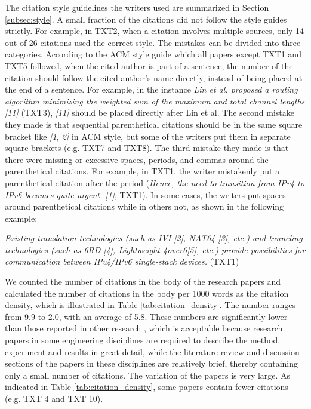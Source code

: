 The citation style guidelines the writers used are summarized in Section \ref{subsec:style}. A small fraction of the citations did not follow the style guides strictly. For example, in TXT2, when a citation involves multiple sources, only 14 out of 26 citations used the correct style. The mistakes can be divided into three categories. According to the ACM style guide which all papers except TXT1 and TXT5 followed, when the cited author is part of a sentence, the number of the citation should follow the cited author’s name directly, instead of being placed at the end of a sentence. For example, in the instance \textit{Lin et al. proposed a routing algorithm minimizing the weighted sum of the maximum and total channel lengths [11]} (TXT3), \textit{[11]} should be placed directly after Lin et al. The second mistake they made is that sequential parenthetical citations should be in the same square bracket like \textit{[1, 2]} in ACM style, but some of the writers put them in separate square brackets (e.g. TXT7 and TXT8). The third mistake they made is that there were missing or excessive spaces, periods, and commas around the parenthetical citations. For example, in TXT1, the writer mistakenly put a parenthetical citation after the period (\textit{Hence, the need to transition from IPv4 to IPv6 becomes quite urgent. [1]}, TXT1). In some cases, the writers put spaces around parenthetical citations while in others not, as shown in the following example:

\textit{Existing translation technologies (such as IVI [2], NAT64 [3], etc.) and tunneling technologies (such as 6RD [4], Lightweight 4over6[5], etc.) provide possibilities for communication between IPv4/IPv6 single-stack devices.} (TXT1)

We counted the number of citations in the body of the research papers and calculated the number of citations in the body per 1000 words as the citation density, which is illustrated in Table \ref{tab:citation_density}. The number ranges from 9.9 to 2.0, with an average of 5.8. These numbers are significantly lower than those reported in other research \citep{fazel_citation_2015,samraj_form_2013,wette_source_2017}, which is acceptable because research papers in some engineering disciplines are required to describe the method, experiment and results in great detail, while the literature review and discussion sections of the papers in these disciplines are relatively brief, thereby containing only a small number of citations. The variation of the papers is very large. As indicated in Table \ref{tab:citation_density}, some papers contain fewer citations (e.g. TXT 4 and TXT 10).


